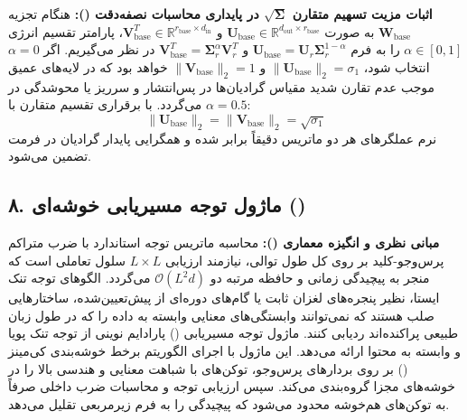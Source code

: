 \textbf{اثبات مزیت تسهیم متقارن $\sqrt{\mathbf{\Sigma}}$ در پایداری محاسبات نصفه‌دقت ():}
هنگام تجزیه $\mathbf{W}_{\text{base}}$ به صورت $\mathbf{U}_{\text{base}} \in \mathbb{R}^{d_{\text{out}} \times r_{\text{base}}}$ و $\mathbf{V}_{\text{base}}^T \in \mathbb{R}^{r_{\text{base}} \times d_{\text{in}}}$، پارامتر تقسیم انرژی $\alpha \in [0, 1]$ را به فرم $\mathbf{U}_{\text{base}} = \mathbf{U}_r \mathbf{\Sigma}_r^{1-\alpha}$ و $\mathbf{V}_{\text{base}}^T = \mathbf{\Sigma}_r^\alpha \mathbf{V}_r^T$ در نظر می‌گیریم.
اگر $\alpha = 0$ انتخاب شود، $\|\mathbf{U}_{\text{base}}\|_2 = \sigma_1$ و $\|\mathbf{V}_{\text{base}}\|_2 = 1$ خواهد بود که در لایه‌های عمیق موجب عدم تقارن شدید مقیاس گرادیان‌ها در پس‌انتشار و سرریز یا محوشدگی در  می‌گردد. با برقراری تقسیم متقارن با $\alpha = 0.5$:
\begin{equation}
\|\mathbf{U}_{\text{base}}\|_2 = \|\mathbf{V}_{\text{base}}\|_2 = \sqrt{\sigma_1}
\end{equation}
نرم عملگرهای هر دو ماتریس دقیقاً برابر شده و همگرایی پایدار گرادیان در فرمت  تضمین می‌شود.



\subsection*{۸. ماژول توجه مسیریابی خوشه‌ای  ()}

\textbf{مبانی نظری و انگیزه معماری ():}
محاسبه ماتریس توجه استاندارد با ضرب متراکم پرس‌وجو-کلید بر روی کل طول توالی، نیازمند ارزیابی $L \times L$ سلول تعاملی است که منجر به پیچیدگی زمانی و حافظه مرتبه دو $\mathcal{O}(L^2 d)$ می‌گردد. الگوهای توجه تنک ایستا، نظیر پنجره‌های لغزان ثابت یا گام‌های دوره‌ای از پیش‌تعیین‌شده، ساختارهایی صلب هستند که نمی‌توانند وابستگی‌های معنایی وابسته به داده را که در طول زبان طبیعی پراکنده‌اند ردیابی کنند.
ماژول توجه مسیریابی () پارادایم نوینی از توجه تنک پویا و وابسته به محتوا ارائه می‌دهد. این ماژول با اجرای الگوریتم برخط خوشه‌بندی کی‌مینز () بر روی بردارهای پرس‌وجو، توکن‌های با شباهت معنایی و هندسی بالا را در خوشه‌های مجزا گروه‌بندی می‌کند. سپس ارزیابی توجه و محاسبات ضرب داخلی صرفاً به توکن‌های هم‌خوشه محدود می‌شود که پیچیدگی را به فرم زیرمربعی تقلیل می‌دهد.

